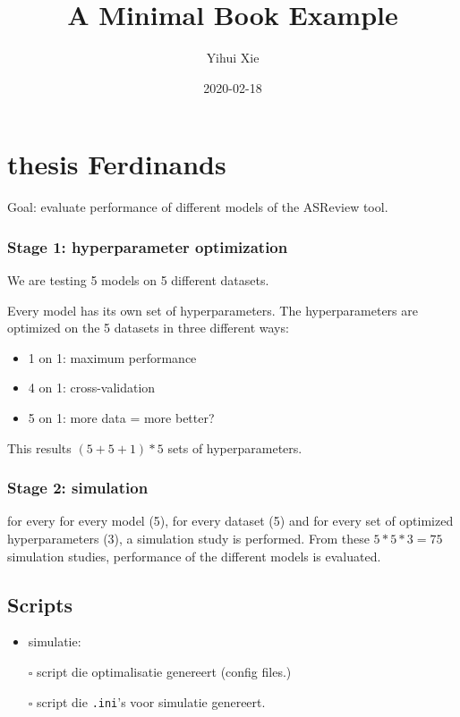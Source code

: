 \documentclass[
]{book}
\title{A Minimal Book Example}
\author{Yihui Xie}
\date{2020-02-18}
\providecommand{\tightlist}{%
  \setlength{\itemsep}{0pt}\setlength{\parskip}{0pt}}
\begin{document}
\maketitle

{
\setcounter{tocdepth}{1}
\tableofcontents
}
\hypertarget{thesis-ferdinands}{%
\chapter{thesis Ferdinands}\label{thesis-ferdinands}}

Goal: evaluate performance of different models of the ASReview tool.

\hypertarget{stage-1-hyperparameter-optimization}{%
\subsection{Stage 1: hyperparameter optimization}\label{stage-1-hyperparameter-optimization}}

We are testing 5 models on 5 different datasets.

Every model has its own set of hyperparameters.
The hyperparameters are optimized on the 5 datasets in three different ways:

\begin{itemize}
\tightlist
\item
  1 on 1: maximum performance
\item
  4 on 1: cross-validation
\item
  5 on 1: more data = more better?
\end{itemize}

This results \((5+5+1)*5\) sets of hyperparameters.

\hypertarget{stage-2-simulation}{%
\subsection{Stage 2: simulation}\label{stage-2-simulation}}

for every for every model (5), for every dataset (5) and for every set of optimized hyperparameters (3), a simulation study is performed. From these \(5*5*3=75\) simulation studies, performance of the different models is evaluated.

\hypertarget{scripts}{%
\section{Scripts}\label{scripts}}

\begin{itemize}
\tightlist
\item
  simulatie:
\item[$\square$]
  script die optimalisatie genereert (config files.)
\item[$\square$]
  script die \texttt{.ini}'s voor simulatie genereert.
\end{itemize}
\end{document}
